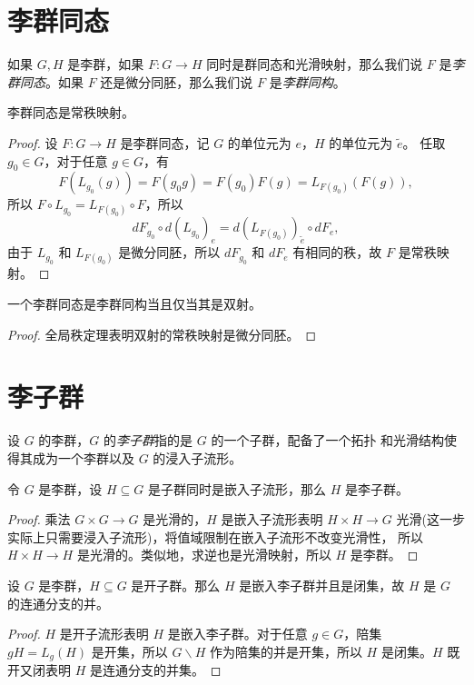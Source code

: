 \documentclass[fontset=none]{Notes}
\begin{document}
\section{李群同态}

如果 $G,H$ 是李群，如果 $F:G\to H$ 同时是群同态和光滑映射，那么我们说
$F$ 是\emph{李群同态}。如果 $F$ 还是微分同胚，那么我们说 $F$
是\emph{李群同构}。

\begin{theorem}
  李群同态是常秩映射。
\end{theorem} 
\begin{proof}
  设 $F:G\to H$ 是李群同态，记 $G$ 的单位元为 $e$，$H$ 的单位元为 $\tilde{e}$。
  任取 $g_0\in G$，对于任意 $g\in G$，有
  \[
    F(L_{g_0}(g))=F(g_0g)=F(g_0)F(g)=L_{F(g_0)}(F(g)),  
  \] 
  所以 $F\circ L_{g_0}=L_{F(g_0)}\circ F$，所以
  \[
    dF_{g_0}\circ d\left(L_{g_0}\right)_e=d\left(L_{F(g_0)}\right)_{\tilde{e}}\circ dF_e,  
  \]
  由于 $L_{g_0}$ 和 $L_{F(g_0)}$ 是微分同胚，所以 $dF_{g_0}$ 和 $dF_e$
  有相同的秩，故 $F$ 是常秩映射。
\end{proof}

\begin{corollary}
  一个李群同态是李群同构当且仅当其是双射。
\end{corollary}
\begin{proof}
  全局秩定理表明双射的常秩映射是微分同胚。
\end{proof}

\section{李子群}

设 $G$ 的李群，$G$ 的\emph{李子群}指的是 $G$ 的一个子群，配备了一个拓扑
和光滑结构使得其成为一个李群以及 $G$ 的浸入子流形。

\begin{proposition}\label{prop:embedding and subgroup is lie subgroup}
  令 $G$ 是李群，设 $H\subseteq G$ 是子群同时是嵌入子流形，那么 $H$ 是李子群。
\end{proposition}
\begin{proof}
  乘法 $G\times G\to G$ 是光滑的，$H$ 是嵌入子流形表明 $H\times H\to G$
  光滑(这一步实际上只需要浸入子流形)，将值域限制在嵌入子流形不改变光滑性，
  所以 $H\times H\to H$ 是光滑的。类似地，求逆也是光滑映射，所以 $H$
  是李群。
\end{proof}

\begin{lemma}
  设 $G$ 是李群，$H\subseteq G$ 是开子群。那么 $H$ 是嵌入李子群并且是闭集，故 $H$
  是 $G$ 的连通分支的并。
\end{lemma}
\begin{proof}
  $H$ 是开子流形表明 $H$ 是嵌入李子群。对于任意 $g\in G$，陪集 $gH=L_g(H)$ 是开集，所以
  $G\smallsetminus H$ 作为陪集的并是开集，所以 $H$ 是闭集。$H$ 既开又闭表明 $H$
  是连通分支的并集。
\end{proof}
\end{document}
